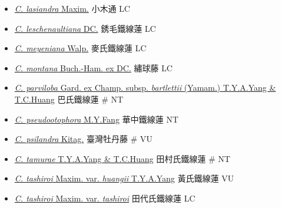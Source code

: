 \begin{itemize}
\begin{itemize}
        \item[] \href{http://www.theplantlist.org/tpl1.1/search?q=Clematis+lasiandra}{\textit{C. lasiandra} Maxim.}   小木通   LC
        \item[] \href{http://www.theplantlist.org/tpl1.1/search?q=Clematis+leschenaultiana}{\textit{C. leschenaultiana} DC.}   銹毛鐵線蓮   LC
        \item[] \href{http://www.theplantlist.org/tpl1.1/search?q=Clematis+meyeniana}{\textit{C. meyeniana} Walp.}   麥氏鐵線蓮   LC
        \item[] \href{http://www.theplantlist.org/tpl1.1/search?q=Clematis+montana}{\textit{C. montana} Buch.-Ham. ex DC.}   繡球藤   LC
        \item[] \href{http://www.theplantlist.org/tpl1.1/search?q=Clematis+parviloba+subsp.+bartlettii}{\textit{C. parviloba} Gard. ex Champ. subsp. \textit{bartlettii} (Yamam.) T.Y.A.Yang \& T.C.Huang}   巴氏鐵線蓮  \# NT
        \item[] \href{http://www.theplantlist.org/tpl1.1/search?q=Clematis+pseudootophora}{\textit{C. pseudootophora} M.Y.Fang}   華中鐵線蓮   NT
        \item[] \href{http://www.theplantlist.org/tpl1.1/search?q=Clematis+psilandra}{\textit{C. psilandra} Kitag.}   臺灣牡丹藤  \# VU
        \item[] \href{http://www.theplantlist.org/tpl1.1/search?q=Clematis+tamurae}{\textit{C. tamurae} T.Y.A.Yang \& T.C.Huang}   田村氏鐵線蓮  \# NT
        \item[] \href{http://www.theplantlist.org/tpl1.1/search?q=Clematis+tashiroi+var.+huangii}{\textit{C. tashiroi} Maxim. var. \textit{huangii} T.Y.A.Yang}   黃氏鐵線蓮   VU
        \item[] \href{http://www.theplantlist.org/tpl1.1/search?q=Clematis+tashiroi+var.+tashiroi}{\textit{C. tashiroi} Maxim. var. \textit{tashiroi}}   田代氏鐵線蓮   LC

\end{itemize}
\end{itemize}
